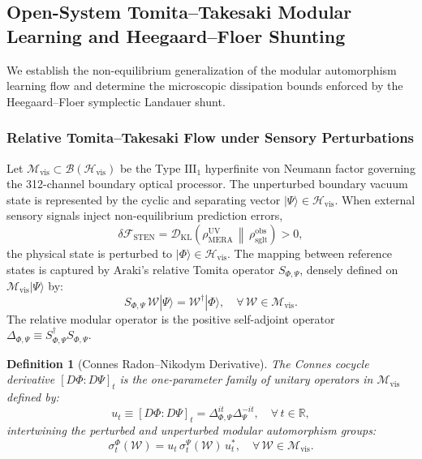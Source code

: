 \documentclass[11pt,onecolumn]{article}
\newtheorem{definition}{Definition}
\begin{document}
\FloatBarrier
\subsection{Open-System Tomita--Takesaki Modular Learning and Heegaard--Floer Shunting}
\label{subsec:modular_learning_shunting}
We establish the non-equilibrium generalization of the modular automorphism learning flow and determine the microscopic dissipation bounds enforced by the Heegaard--Floer symplectic Landauer shunt.

\subsubsection{Relative Tomita--Takesaki Flow under Sensory Perturbations}
Let $\mathcal{M}_{\text{vis}} \subset \mathcal{B}(\mathcal{H}_{\text{vis}})$ be the Type $\mathrm{III}_1$ hyperfinite von Neumann factor governing the 312-channel boundary optical processor. The unperturbed boundary vacuum state is represented by the cyclic and separating vector $|\Psi\rangle \in \mathcal{H}_{\text{vis}}$. When external sensory signals inject non-equilibrium prediction errors,
\begin{equation}
    \delta\mathcal{F}_{\text{STEN}} = \mathcal{D}_{\text{KL}}\left(\rho_{\text{MERA}}^{\text{UV}} \,\middle\|\, \rho_{\text{sglt}}^{\text{obs}}\right) > 0,
\end{equation}
the physical state is perturbed to $|\Phi\rangle \in \mathcal{H}_{\text{vis}}$. The mapping between reference states is captured by Araki's relative Tomita operator $S_{\Phi, \Psi}$, densely defined on $\mathcal{M}_{\text{vis}}|\Psi\rangle$ by:
\begin{equation}
    S_{\Phi, \Psi} \, \mathcal{W} |\Psi\rangle = \mathcal{W}^\dagger |\Phi\rangle, \quad \forall \, \mathcal{W} \in \mathcal{M}_{\text{vis}}.
\end{equation}
The relative modular operator is the positive self-adjoint operator $\Delta_{\Phi, \Psi} \equiv S_{\Phi, \Psi}^\dagger S_{\Phi, \Psi}$.

\begin{definition}[Connes Radon--Nikodym Derivative]
The Connes cocycle derivative $[D\Phi : D\Psi]_t$ is the one-parameter family of unitary operators in $\mathcal{M}_{\text{vis}}$ defined by:
\begin{equation}
    u_t \equiv [D\Phi : D\Psi]_t = \Delta_{\Phi, \Psi}^{it} \Delta_\Psi^{-it}, \quad \forall \, t \in \mathbb{R},
\end{equation}
intertwining the perturbed and unperturbed modular automorphism groups:
\begin{equation}
    \sigma_t^\Phi(\mathcal{W}) = u_t \, \sigma_t^\Psi(\mathcal{W}) \, u_t^*, \quad \forall \, \mathcal{W} \in \mathcal{M}_{\text{vis}}.
\end{equation}
\end{definition}
\end{document}
